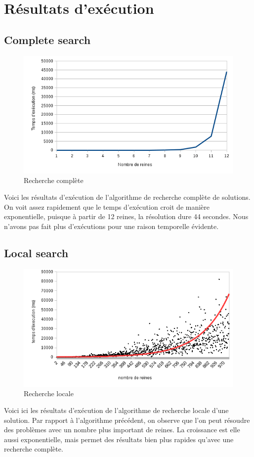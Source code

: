 \documentclass{article}
\begin{document}
\section{Résultats d'exécution}
\subsection{Complete search}
\begin{figure}[!h]
	\caption{\label{csearch} Recherche complète}
	\begin{center}
	\includegraphics[scale=0.5]{./picture/compelte_search.png}
	\end{center}
\end{figure}
Voici les résultats d'exécution de l'algorithme de recherche complète de solutions. On voit assez rapidement que le temps d'exécution croit de manière exponentielle, puisque à partir de 12 reines, la résolution dure 44 secondes. Nous n'avons pas fait plus d'exécutions pour une raison temporelle évidente.

\subsection{Local search}
\begin{figure}[!h]
	\caption{\label{lsearch} Recherche locale}
	\begin{center}
	\includegraphics[scale=0.5]{./picture/local_search.png}
	\end{center}
\end{figure}
Voici ici les résultats d'exécution de l'algorithme de recherche locale d'une solution. Par rapport à l'algorithme précédent, on observe que l'on peut résoudre des problèmes avec un nombre plus important de reines. La croissance est elle aussi exponentielle, mais permet des résultats bien plus rapides qu'avec une recherche complète. 
\end{document}
